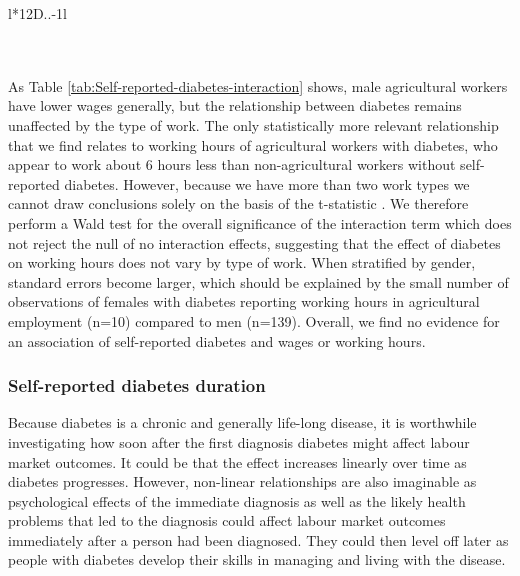 \begin{table}[h]
\begin{center}
{\begin{tabular}{l*{12}{D{.}{.}{-1}l}}
\bottomrule
{}\\
\\
\\
\end{tabular}
}
\end{center}
\caption{\label{tab:Self-reported-diabetes-interaction}\textbf{Relationship of self-reported diabetes by worktype and wages and working hours (fixed effects)}}
\end{table}  
  
As Table \ref{tab:Self-reported-diabetes-interaction} shows, male
agricultural workers have lower wages generally, but the relationship
between diabetes remains unaffected by the type of work. The only
statistically more relevant relationship that we find relates to working
hours of agricultural workers with diabetes, who appear to work about
6 hours less than non-agricultural workers without self-reported diabetes.
However, because we have more than two work types we cannot draw conclusions
solely on the basis of the t-statistic . We therefore perform a Wald
test for the overall significance of the interaction term which does
not reject the null of no interaction effects, suggesting that the
effect of diabetes on working hours does not vary by type of work.
When stratified by gender, standard errors become larger, which should
be explained by the small number of observations of females with diabetes
reporting working hours in agricultural employment (n=10) compared
to men (n=139). Overall, we find no evidence for an association of
self-reported diabetes and wages or working hours.

\subsubsection*{Self-reported diabetes duration}

Because diabetes is a chronic and generally life-long disease, it
is worthwhile investigating how soon after the first diagnosis diabetes
might affect labour market outcomes. It could be that the effect increases
linearly over time as diabetes progresses. However, non-linear relationships
are also imaginable as psychological effects of the immediate diagnosis
as well as the likely health problems that led to the diagnosis could
affect labour market outcomes immediately after a person had been
diagnosed. They could then level off later as people with diabetes
develop their skills in managing and living with the disease.

